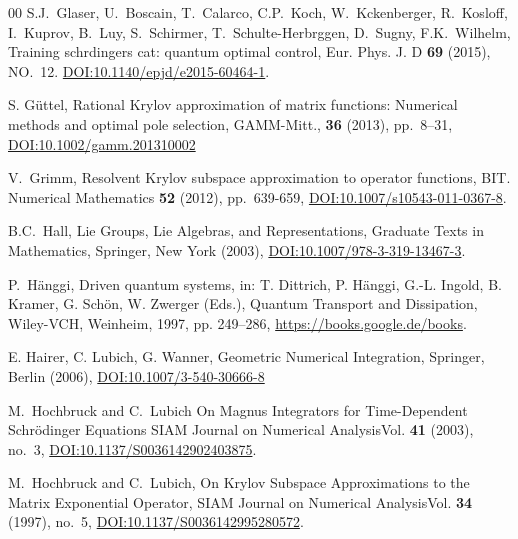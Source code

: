 \documentclass{article}
\begin{document}
\begin{thebibliography}{00}
S.J.~Glaser, U.~Boscain, T.~Calarco, C.P.~Koch, W.~Kckenberger, R.~Kosloff,
I.~Kuprov, B.~Luy, S.~Schirmer, T.~Schulte-Herbrggen, D.~Sugny, F.K.~Wilhelm,
\newblock Training schrdingers cat: quantum optimal control, 
\newblock Eur. Phys. J. D \textbf{69} (2015), NO.~12.
\href{https://doi.org/10.1140/epjd/e2015-60464-1}{DOI:10.1140/epjd/e2015-60464-1}.


S. Güttel, 
\newblock Rational Krylov approximation of matrix functions: Numerical methods and optimal pole selection, 
\newblock GAMM-Mitt., \textbf{36} (2013), pp.~8–31, \href{ https://doi.org/10.1002/gamm.201310002}{DOI:10.1002/gamm.201310002}


V.~Grimm,
\newblock Resolvent Krylov subspace approximation to operator functions,
\newblock BIT. Numerical Mathematics \textbf{52} (2012), pp.~639-659, \href{https://doi.org/10.1007/s10543-011-0367-8}{DOI:10.1007/s10543-011-0367-8}.


B.C.~Hall, 
\newblock Lie Groups, Lie Algebras, and Representations, 
\newblock Graduate Texts in Mathematics, Springer, New York (2003), \href{https://doi.org/10.1007/978-3-319-13467-3}{DOI:10.1007/978-3-319-13467-3}.


P.~Hänggi, 
\newblock Driven quantum systems, 
\newblock in: T. Dittrich, P. Hänggi, G.-L. Ingold, B. Kramer, G. Schön, W. Zwerger (Eds.), Quantum Transport and Dissipation, Wiley-VCH, Weinheim, 1997, pp. 249–286, \href{https://books.google.de/books?id=pRXLzQEACAAJ}{https://books.google.de/books}.


E. Hairer, C. Lubich, G. Wanner, 
\newblock Geometric Numerical Integration, 
\newblock Springer, Berlin (2006), \href{https://doi.org/10.1007/3-540-30666-8}{DOI:10.1007/3-540-30666-8}



M.~Hochbruck and C.~Lubich
\newblock On Magnus Integrators for Time-Dependent Schrödinger Equations
\newblock SIAM Journal on Numerical AnalysisVol. \textbf{41} (2003), no.~3, \href{https://doi.org/10.1137/S0036142902403875}{DOI:10.1137/S0036142902403875}.


M.~Hochbruck and C.~Lubich,
\newblock On Krylov Subspace Approximations to the Matrix Exponential Operator,
\newblock SIAM Journal on Numerical AnalysisVol. \textbf{34} (1997), no.~5, \href{https://doi.org/10.1137/S0036142995280572}{DOI:10.1137/S0036142995280572}.



\end{thebibliography}
\end{document}
